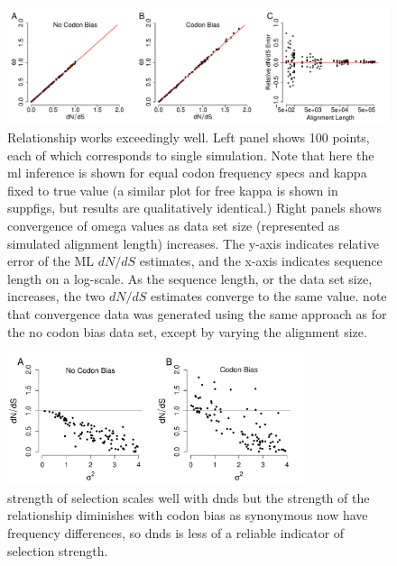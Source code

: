 \documentclass{pnastwo}
\begin{document}
\begin{figure}[H]
\centerline{\includegraphics[width=18.7cm]{figures/MainText/regression_convergence.pdf}}
\caption{\label{reg_conv} Relationship works exceedingly well. Left panel shows 100 points, each of which corresponds to single simulation. Note that here the ml inference is shown for equal codon frequency specs and kappa fixed to true value (a similar plot for free kappa is shown in suppfigs, but results are qualitatively identical.) Right panels shows convergence of omega values as data set size (represented as simulated alignment length) increases. The y-axis indicates relative error of the ML $dN/dS$ estimates, and the x-axis indicates sequence length on a log-scale. As the sequence length, or the data set size, increases, the two $dN/dS$ estimates converge to the same value. note that convergence data was generated using the same approach as for the no codon bias data set, except by varying the alignment size.}
\end{figure}


\bigskip
\bigskip
\bigskip
\bigskip

\begin{figure}[H]
\centerline{\includegraphics[width=8.7cm]{figures/MainText/sd_vs_dnds.pdf}}
\caption{\label{stddev_dnds} strength of selection scales well with dnds but the strength of the relationship diminishes with codon bias as synonymous now have frequency differences, so dnds is less of a reliable indicator of selection strength.}
\end{figure}

\bigskip
\bigskip
\bigskip
\bigskip
\end{document}
